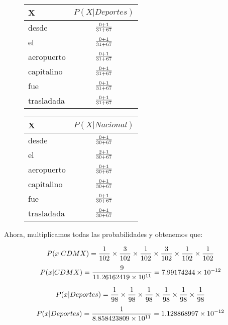 \begin{figure}[H]
  \begin{center}
    \begin{tabular}{ l | c }
      X & $P(X|Deportes)$ \\ \hline
      desde & $0 + 1 \over {31 + 67}$ \\ \hline
      el & $0 + 1 \over {31 + 67}$ \\ \hline
      aeropuerto & $0 + 1 \over {31 + 67}$ \\ \hline
      capitalino & $0 + 1 \over {31 + 67}$ \\ \hline
      fue & $0 + 1 \over {31 + 67}$ \\ \hline
      trasladada & $0 + 1 \over {31 + 67}$ \\
    \end{tabular}
  \end{center}
\end{figure}

\begin{figure}[H]
  \begin{center}
    \begin{tabular}{ l | c }
      X & $P(X|Nacional)$ \\ \hline
      desde & $0 + 1 \over {30 + 67}$ \\ \hline
      el & $2 + 1 \over {30 + 67}$ \\ \hline
      aeropuerto & $0 + 1 \over {30 + 67}$ \\ \hline
      capitalino & $0 + 1 \over {30 + 67}$ \\ \hline
      fue & $0 + 1 \over {30 + 67}$ \\ \hline
      trasladada & $0 + 1 \over {30 + 67}$ \\
    \end{tabular}
  \end{center}
\end{figure}

Ahora, multiplicamos todas las probabilidades y obtenemos que: 

\[ P(x | CDMX) = {1 \over 102} \times {3 \over 102} \times {1 \over 102} \times {3 \over 102} \times {1 \over 102} \times {1 \over 102} \]
\[ P(x | CDMX) = { 9 \over 11.26162419\times10^{11}} = 7.99174244\times10^{-12} \]

\[ P(x | Deportes) = {1 \over 98} \times {1 \over 98} \times {1 \over 98} \times {1 \over 98} \times {1 \over 98} \times {1 \over 98} \]
\[ P(x | Deportes) = { 1 \over 8.858423809\times10^{11} } = 1.128868997\times10^{-12} \]


